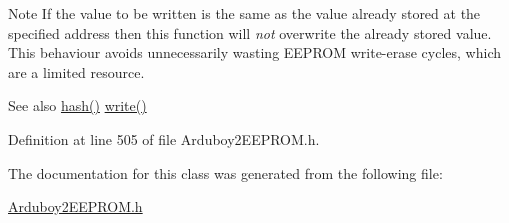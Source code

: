 \begin{DoxyNote}{Note}
If the value to be written is the same as the value already stored at the specified address then this function will {\itshape not} overwrite the already stored value. This behaviour avoids unnecessarily wasting E\+E\+P\+R\+OM write-\/erase cycles, which are a limited resource.
\end{DoxyNote}
\begin{DoxySeeAlso}{See also}
\mbox{\hyperlink{classArduboy2EEPROM_a03bad380b02c4aa613f5a84b7e2712b6}{hash()}} \mbox{\hyperlink{classArduboy2EEPROM_abf7be1f27f4815de59257210dac8c9eb}{write()}} 
\end{DoxySeeAlso}


Definition at line 505 of file Arduboy2\+E\+E\+P\+R\+O\+M.\+h.



The documentation for this class was generated from the following file\+:\begin{DoxyCompactItemize}
\item 
\mbox{\hyperlink{Arduboy2EEPROM_8h}{Arduboy2\+E\+E\+P\+R\+O\+M.\+h}}\end{DoxyCompactItemize}
